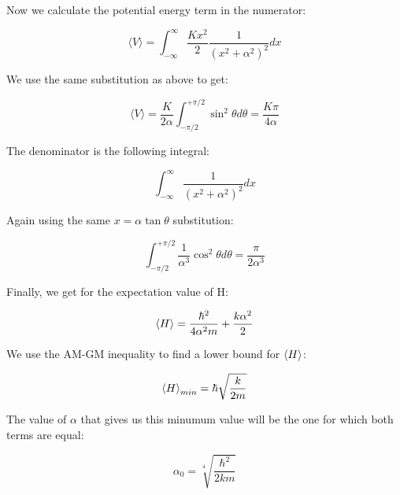 Now we calculate the potential energy term in the numerator:

\begin{equation}
    \langle V \rangle = \int_{-\infty}^{\infty}   \frac{K x^2}{2} \frac{1}{(x^2 + \alpha^2)^2} dx 
\end{equation}

We use the same substitution as above to get:

\begin{equation}
     \langle V \rangle = \frac{K}{2 \alpha}  \int_{-\pi/2}^{+\pi/2} \sin^2 \theta d \theta = \frac{K \pi}{4 \alpha} 
\end{equation}

The denominator is the following integral:

\begin{equation}
\int_{-\infty}^{\infty}  \frac{1}{(x^2 + \alpha^2)^2} dx
\end{equation}

Again using the same $x = \alpha \tan \theta$ substitution: 

\begin{equation}
\int_{-\pi/2}^{+\pi/2}  \frac{1}{\alpha^3} \cos^2 \theta d \theta= \frac{\pi}{2 \alpha^3} 
\end{equation}
 
 Finally, we get for the expectation value of H:
 
 \begin{equation}
     \expectationvalue{H} = \frac{\hbar^2}{4 \alpha^2 m} + \frac{k \alpha^2}{2}
 \end{equation}
 
 We use the AM-GM inequality to find a lower bound for $\expectationvalue{H}$:
 
 \begin{equation}
     \expectationvalue{H}_{min} = \hbar \sqrt{\frac{k}{2m}}
 \end{equation}
 
 The value of $\alpha$ that gives us this minumum value will be the one for
 which both terms are equal:
 
 \begin{equation}
     \alpha_0 = \sqrt[4]{\frac{\hbar^2}{2 k m}}
 \end{equation}
 
